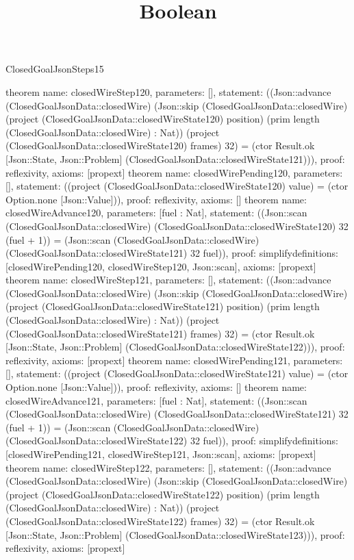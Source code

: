 \begin{lexlean}{ClosedGoalJsonSteps15}
\title{Boolean}
\begin{semanticmodule}
theorem{
 name: closedWireStep120, parameters: [],
 statement: ((Json::advance (ClosedGoalJsonData::closedWire) (Json::skip (ClosedGoalJsonData::closedWire) (project (ClosedGoalJsonData::closedWireState120) position) (prim length (ClosedGoalJsonData::closedWire) : Nat)) (project (ClosedGoalJsonData::closedWireState120) frames) 32) = (ctor Result.ok [Json::State, Json::Problem] (ClosedGoalJsonData::closedWireState121))), proof: reflexivity{}, axioms: [propext]
}
theorem{
 name: closedWirePending120, parameters: [],
 statement: ((project (ClosedGoalJsonData::closedWireState120) value) = (ctor Option.none [Json::Value])), proof: reflexivity{}, axioms: []
}
theorem{
 name: closedWireAdvance120, parameters: [fuel : Nat],
 statement: ((Json::scan (ClosedGoalJsonData::closedWire) (ClosedGoalJsonData::closedWireState120) 32 (fuel + 1)) = (Json::scan (ClosedGoalJsonData::closedWire) (ClosedGoalJsonData::closedWireState121) 32 fuel)), proof: simplify{definitions: [closedWirePending120, closedWireStep120, Json::scan]}, axioms: [propext]
}
theorem{
 name: closedWireStep121, parameters: [],
 statement: ((Json::advance (ClosedGoalJsonData::closedWire) (Json::skip (ClosedGoalJsonData::closedWire) (project (ClosedGoalJsonData::closedWireState121) position) (prim length (ClosedGoalJsonData::closedWire) : Nat)) (project (ClosedGoalJsonData::closedWireState121) frames) 32) = (ctor Result.ok [Json::State, Json::Problem] (ClosedGoalJsonData::closedWireState122))), proof: reflexivity{}, axioms: [propext]
}
theorem{
 name: closedWirePending121, parameters: [],
 statement: ((project (ClosedGoalJsonData::closedWireState121) value) = (ctor Option.none [Json::Value])), proof: reflexivity{}, axioms: []
}
theorem{
 name: closedWireAdvance121, parameters: [fuel : Nat],
 statement: ((Json::scan (ClosedGoalJsonData::closedWire) (ClosedGoalJsonData::closedWireState121) 32 (fuel + 1)) = (Json::scan (ClosedGoalJsonData::closedWire) (ClosedGoalJsonData::closedWireState122) 32 fuel)), proof: simplify{definitions: [closedWirePending121, closedWireStep121, Json::scan]}, axioms: [propext]
}
theorem{
 name: closedWireStep122, parameters: [],
 statement: ((Json::advance (ClosedGoalJsonData::closedWire) (Json::skip (ClosedGoalJsonData::closedWire) (project (ClosedGoalJsonData::closedWireState122) position) (prim length (ClosedGoalJsonData::closedWire) : Nat)) (project (ClosedGoalJsonData::closedWireState122) frames) 32) = (ctor Result.ok [Json::State, Json::Problem] (ClosedGoalJsonData::closedWireState123))), proof: reflexivity{}, axioms: [propext]
}
\end{semanticmodule}
\end{lexlean}
